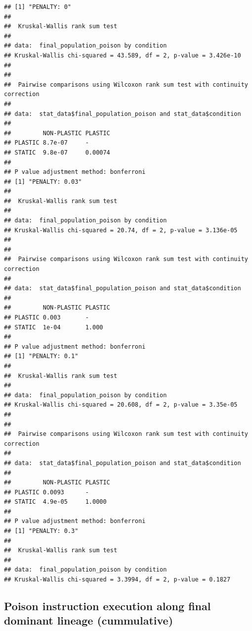 \documentclass[]{book}
\begin{document}
\begin{verbatim}
## [1] "PENALTY: 0"
## 
##  Kruskal-Wallis rank sum test
## 
## data:  final_population_poison by condition
## Kruskal-Wallis chi-squared = 43.589, df = 2, p-value = 3.426e-10
## 
## 
##  Pairwise comparisons using Wilcoxon rank sum test with continuity correction 
## 
## data:  stat_data$final_population_poison and stat_data$condition 
## 
##         NON-PLASTIC PLASTIC
## PLASTIC 8.7e-07     -      
## STATIC  9.8e-07     0.00074
## 
## P value adjustment method: bonferroni 
## [1] "PENALTY: 0.03"
## 
##  Kruskal-Wallis rank sum test
## 
## data:  final_population_poison by condition
## Kruskal-Wallis chi-squared = 20.74, df = 2, p-value = 3.136e-05
## 
## 
##  Pairwise comparisons using Wilcoxon rank sum test with continuity correction 
## 
## data:  stat_data$final_population_poison and stat_data$condition 
## 
##         NON-PLASTIC PLASTIC
## PLASTIC 0.003       -      
## STATIC  1e-04       1.000  
## 
## P value adjustment method: bonferroni 
## [1] "PENALTY: 0.1"
## 
##  Kruskal-Wallis rank sum test
## 
## data:  final_population_poison by condition
## Kruskal-Wallis chi-squared = 20.608, df = 2, p-value = 3.35e-05
## 
## 
##  Pairwise comparisons using Wilcoxon rank sum test with continuity correction 
## 
## data:  stat_data$final_population_poison and stat_data$condition 
## 
##         NON-PLASTIC PLASTIC
## PLASTIC 0.0093      -      
## STATIC  4.9e-05     1.0000 
## 
## P value adjustment method: bonferroni 
## [1] "PENALTY: 0.3"
## 
##  Kruskal-Wallis rank sum test
## 
## data:  final_population_poison by condition
## Kruskal-Wallis chi-squared = 3.3994, df = 2, p-value = 0.1827
\end{verbatim}

\hypertarget{poison-instruction-execution-along-final-dominant-lineage-cummulative}{%
\subsection{Poison instruction execution along final dominant lineage (cummulative)}\label{poison-instruction-execution-along-final-dominant-lineage-cummulative}}
\end{document}
